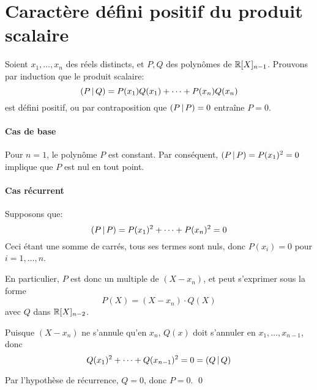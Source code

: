\section{Caractère défini positif du produit scalaire}
\label{sec:math/defini-pos}

Soient $x_1,\ldots,x_n$ des réels distincts,
et $P,Q$ des polynômes de $\mathbb{R}[X]_{n-1}$.
Prouvons par induction que le produit scalaire:
\begin{equation}
    \left(P\,\middle|\,Q\right) = P(x_1)Q(x_1) + \cdots + P(x_n)Q(x_n)
\end{equation}
est défini positif,
ou par contraposition que $\left(P\,\middle|\,P\right)=0$ entraîne $P=0$.

\paragraph{Cas de base}
Pour $n=1$, le polynôme $P$ est constant.
Par conséquent, $\left(P\,\middle|\,P\right) = P(x_1)^2 = 0$
implique que $P$ est nul en tout point.


\paragraph{Cas récurrent}
Supposons que:
\begin{equation}
    \left(P\,\middle|\,P\right) = P(x_1)^2 + \cdots + P(x_n)^2 = 0
\end{equation}
Ceci étant une somme de carrés, tous ses termes sont nuls,
donc $P(x_i) = 0$ pour $i=1,\ldots,n$.

En particulier, $P$ est donc un multiple de $(X-x_n)$,
et peut s'exprimer sous la forme
\begin{equation}
    P(X) = (X-x_n)\cdot Q(X)
\end{equation}
avec $Q$ dans $\mathbb{R}[X]_{n-2}$.

Puisque $(X-x_n)$ ne s'annule qu'en $x_n$,
$Q(x)$ doit s'annuler en $x_1,\ldots,x_{n-1}$,
donc
\begin{equation}
    Q(x_1)^2 + \cdots + Q(x_{n-1})^2 = 0 = \left(Q\,\middle|\,Q\right)
\end{equation}

Par l'hypothèse de récurrence, $Q=0$, donc $P=0$. \qed
